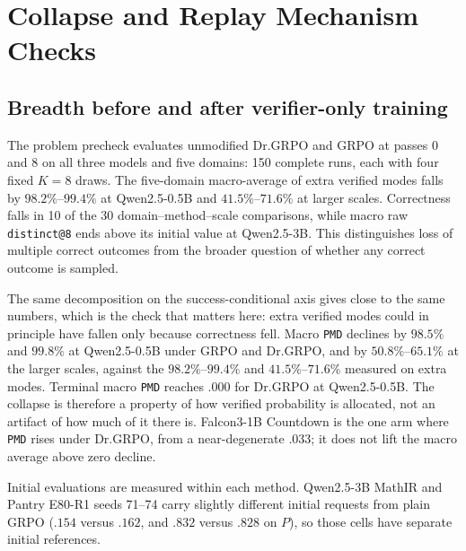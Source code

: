 \documentclass{article}
\newcommand{\1}{\mathbf 1}
\newcommand{\pmd}{\texttt{PMD}}
\theoremstyle{remark}
\theoremstyle{definition}
\theoremstyle{plain}
\begin{document}


\section{Collapse and Replay Mechanism Checks}
\label{app:ablations}





\subsection{Breadth before and after verifier-only training}
\label{app:pre-rl-regression}

The problem precheck evaluates unmodified Dr.GRPO and GRPO at passes 0 and 8
on all three models and five domains: 150 complete runs, each with four
fixed $K=8$ draws. The five-domain macro-average of extra verified modes
falls by $98.2\%$--$99.4\%$ at Qwen2.5-0.5B and $41.5\%$--$71.6\%$ at
larger scales. Correctness falls in 10 of the 30 domain--method--scale
comparisons, while macro raw \texttt{distinct@8} ends above its initial
value at Qwen2.5-3B. This distinguishes loss of multiple correct outcomes
from the broader question of whether any correct outcome is sampled.

The same decomposition on the success-conditional axis gives close to the same
numbers, which is the check that matters here: extra verified modes could in
principle have fallen only because correctness fell. Macro \pmd{} declines by
$98.5\%$ and $99.8\%$ at Qwen2.5-0.5B under GRPO and Dr.GRPO, and by
$50.8\%$--$65.1\%$ at the larger scales, against the $98.2\%$--$99.4\%$ and
$41.5\%$--$71.6\%$ measured on extra modes. Terminal macro \pmd{} reaches
$.000$ for Dr.GRPO at Qwen2.5-0.5B. The collapse is therefore a property of how
verified probability is allocated, not an artifact of how much of it there is.
Falcon3-1B Countdown is the one arm where \pmd{} rises under Dr.GRPO, from a
near-degenerate $.033$; it does not lift the macro average above zero decline.

Initial evaluations are measured within each method. Qwen2.5-3B MathIR and
Pantry E80-R1 seeds 71--74 carry slightly different initial requests from plain
GRPO ($.154$ versus $.162$, and $.832$ versus $.828$ on $P$), so those cells
have separate initial references.
\end{document}

